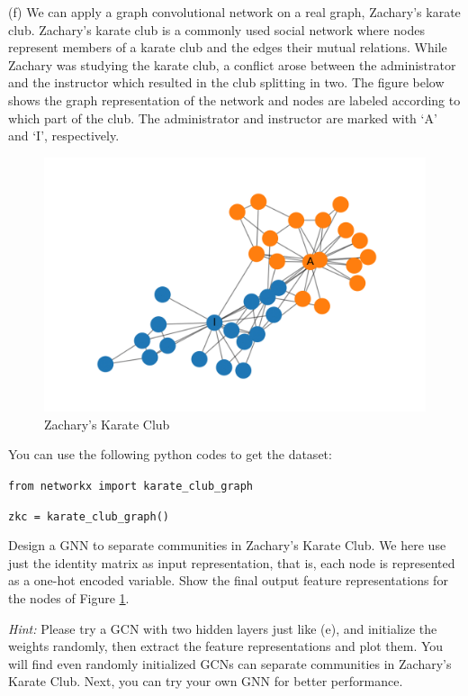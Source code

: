 \documentclass[openany]{ctexbook}
\theoremstyle{kaiti}
\theoremstyle{normal}
\begin{document}
(f) We can apply a graph convolutional network on a real graph, Zachary's karate club. Zachary's karate club is a commonly used social network where nodes represent members of a karate club and the edges their mutual relations. While Zachary was studying the karate club, a conflict arose between the administrator and the instructor which resulted in the club splitting in two. The figure below shows the graph representation of the network and nodes are labeled according to which part of the club. The administrator and instructor are marked with `A' and `I', respectively.

\begin{figure}[ht]
  \centering
  \includegraphics[scale=0.22]{club.png}
  \caption{Zachary's Karate Club}
  \label{fig:2_2}
\end{figure}

You can use the following python codes to get the dataset:

\verb|from networkx import karate_club_graph|

\verb|zkc = karate_club_graph()|

Design a GNN to separate communities in Zachary's Karate Club. We here use just the identity matrix as input representation, that is, each node is represented as a one-hot encoded variable. Show the final output feature representations for the nodes of Figure \ref{fig:2_2}. 

\emph{Hint:} Please try a GCN with two hidden layers just like (e), and initialize the weights randomly, then extract the feature representations and plot them. You will find even randomly initialized GCNs can separate communities in Zachary's Karate Club. Next, you can try your own GNN for better performance.
\end{document}
